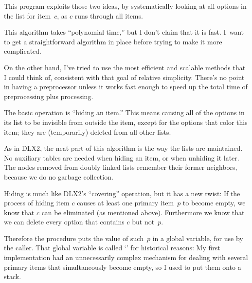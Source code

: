 This program exploits those two ideas, by systematically looking at
all options in the list for item~$c$, as $c$ runs through all items.

This algorithm takes ``polynomial time,'' but I don't claim that it is fast.
I~want to get a straightforward algorithm in place before trying to
make it more complicated.

On the other hand, I've tried to use the most efficient and scalable
methods that I could think of, consistent with that goal of relative
simplicity. There's no point in having a preprocessor unless it works
fast enough to speed up the total time of preprocessing plus processing.

\fi

The basic operation is ``hiding an item.'' This means causing all of
the options in its list to be invisible from outside the item, except
for the options that color this item; they are
(temporarily) deleted from all other lists.

As in {\mc DLX2}, the neat part of this algorithm is the way the lists are
maintained. No auxiliary tables are needed when hiding an item, or
when unhiding it later. The nodes removed from doubly linked lists remember
their former neighbors, because we do no garbage collection.

\fi

Hiding is much like {\mc DLX2}'s ``covering'' operation, but it
has a new twist:
If the process of hiding item $c$ causes at least one primary item~$p$
to become empty, we know that $c$ can be eliminated
(as mentioned above). Furthermore we know that we can delete every
option that contains $c$ but not~$p$.

Therefore the  procedure puts the value of such~$p$ in a global
variable, for use by the caller. That global variable is called
`' for historical reasons: My first implementation had
an unnecessarily complex mechanism for dealing with several
primary items that simultaneously become empty, so I used to
put them onto a stack.

